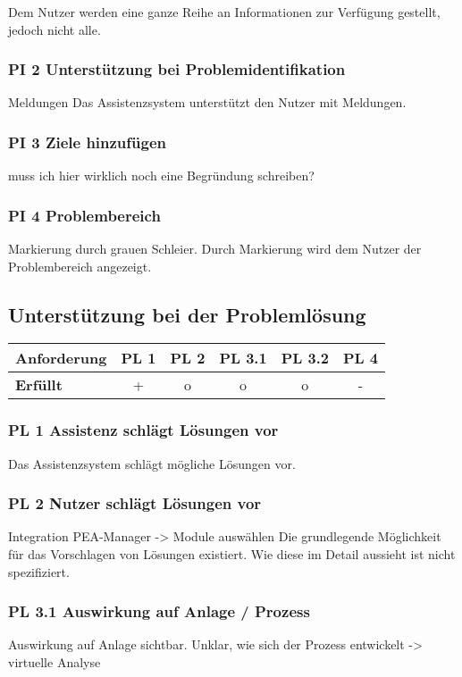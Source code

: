  Dem Nutzer werden eine ganze Reihe an Informationen zur Verfügung gestellt, jedoch nicht alle.

\subsubsection*{PI 2 Unterstützung bei Problemidentifikation}
Meldungen
Das Assistenzsystem unterstützt den Nutzer mit Meldungen.

\subsubsection*{PI 3 Ziele hinzufügen}
muss ich hier wirklich noch eine Begründung schreiben?

\subsubsection*{PI 4 Problembereich}
Markierung durch grauen Schleier.
Durch Markierung wird dem Nutzer der Problembereich angezeigt.

\subsection{Unterstützung bei der Problemlösung}
\begin{table}[htbp]
\centering
\begin{tabular}{l|c|c|c|c|c}
\textbf{Anforderung} & PL 1 & PL 2 & PL 3.1 & PL 3.2 & PL 4 \\
\hline
\textbf{Erfüllt} & + & o & o & o & - \\
\end{tabular}
\end{table}

\subsubsection*{PL 1 Assistenz schlägt Lösungen vor}
Das Assistenzsystem schlägt mögliche Lösungen vor.

\subsubsection*{PL 2 Nutzer schlägt Lösungen vor}
Integration PEA-Manager -> Module auswählen
Die grundlegende Möglichkeit für das Vorschlagen von Lösungen existiert. Wie diese im Detail aussieht ist nicht spezifiziert.

\subsubsection*{PL 3.1 Auswirkung auf Anlage / Prozess}
Auswirkung auf Anlage sichtbar. Unklar, wie sich der Prozess entwickelt -> virtuelle Analyse

